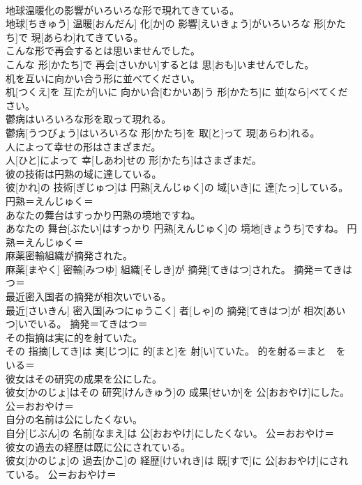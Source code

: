 \documentclass[8pt]{extreport}
\begin{document}
\begin{CJK}{UTF8}{min}
{\\	地球温暖化の影響がいろいろな形で現れてきている。	
\\	地球[ちきゅう] 温暖[おんだん] 化[か]の 影響[えいきょう]がいろいろな 形[かたち]で 現[あらわ]れてきている。	
\\	こんな形で再会するとは思いませんでした。	
\\	こんな 形[かたち]で 再会[さいかい]するとは 思[おも]いませんでした。	
\\	机を互いに向かい合う形に並べてください。	
\\	机[つくえ]を 互[たが]いに 向かい合[むかいあ]う 形[かたち]に 並[なら]べてください。	
\\	鬱病はいろいろな形を取って現れる。	
\\	鬱病[うつびょう]はいろいろな 形[かたち]を 取[と]って 現[あらわ]れる。	
\\	人によって幸せの形はさまざまだ。	
\\	人[ひと]によって 幸[しあわ]せの 形[かたち]はさまざまだ。	
\\	彼の技術は円熟の域に達している。	
\\	彼[かれ]の 技術[ぎじゅつ]は 円熟[えんじゅく]の 域[いき]に 達[たっ]している。	円熟＝えんじゅく＝ 
\\	あなたの舞台はすっかり円熟の境地ですね。	
\\	あなたの 舞台[ぶたい]はすっかり 円熟[えんじゅく]の 境地[きょうち]ですね。	円熟＝えんじゅく＝ 
\\	麻薬密輸組織が摘発された。	
\\	麻薬[まやく] 密輸[みつゆ] 組織[そしき]が 摘発[てきはつ]された。	摘発＝てきはつ＝ 
\\	最近密入国者の摘発が相次いでいる。	
\\	最近[さいきん] 密入国[みつにゅうこく] 者[しゃ]の 摘発[てきはつ]が 相次[あいつ]いでいる。	摘発＝てきはつ＝ 
\\	その指摘は実に的を射ていた。	
\\	その 指摘[してき]は 実[じつ]に 的[まと]を 射[い]ていた。	的を射る＝まと　を　いる＝ 
\\	彼女はその研究の成果を公にした。	
\\	彼女[かのじょ]はその 研究[けんきゅう]の 成果[せいか]を 公[おおやけ]にした。	公＝おおやけ＝ 
\\	自分の名前は公にしたくない。	
\\	自分[じぶん]の 名前[なまえ]は 公[おおやけ]にしたくない。	公＝おおやけ＝ 
\\	彼女の過去の経歴は既に公にされている。	
\\	彼女[かのじょ]の 過去[かこ]の 経歴[けいれき]は 既[すで]に 公[おおやけ]にされている。	公＝おおやけ＝ 
}
\end{CJK}
\end{document}
